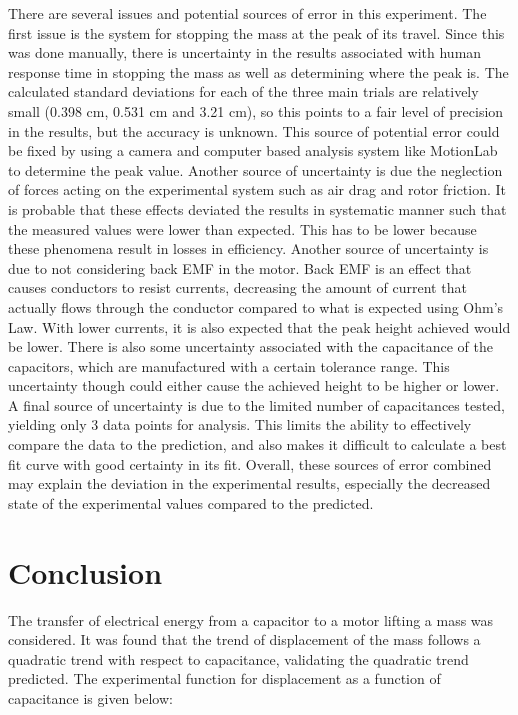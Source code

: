 \documentclass[12pt,letterpaper]{article}
\begin{document}
There are several issues and potential sources of error in this experiment. The first issue is the system for stopping the mass at the peak of its travel. Since this was done manually, there is uncertainty in the results associated with human response time in stopping the mass as well as determining where the peak is. The calculated standard deviations for each of the three main trials are relatively small (0.398 cm, 0.531 cm and 3.21 cm), so this points to a fair level of precision in the results, but the accuracy is unknown. This source of potential error could be fixed by using a camera and computer based analysis system like MotionLab to determine the peak value. Another source of uncertainty is due the neglection of forces acting on the experimental system such as air drag and rotor friction. It is probable that these effects deviated the results in systematic manner such that the measured values were lower than expected. This has to be lower because these phenomena result in losses in efficiency. Another source of uncertainty is due to not considering back EMF in the motor. Back EMF is an effect that causes conductors to resist currents, decreasing the amount of current that actually flows through the conductor compared to what is expected using Ohm's Law. With lower currents, it is also expected that the peak height achieved would be lower. There is also some uncertainty associated with the capacitance of the capacitors, which are manufactured with a certain tolerance range. This uncertainty though could either cause the achieved height to be higher or lower. A final source of uncertainty is due to the limited number of capacitances tested, yielding only 3 data points for analysis. This limits the ability to effectively compare the data to the prediction, and also makes it difficult to calculate a best fit curve with good certainty in its fit. Overall, these sources of error combined may explain the deviation in the experimental results, especially the decreased state of the experimental values compared to the predicted.

\section{Conclusion}
The transfer of electrical energy from a capacitor to a motor lifting a mass was considered. It was found that the trend of displacement of the mass follows a quadratic trend with respect to capacitance, validating the quadratic trend predicted. The experimental function for displacement as a function of capacitance is given below:
\end{document}
